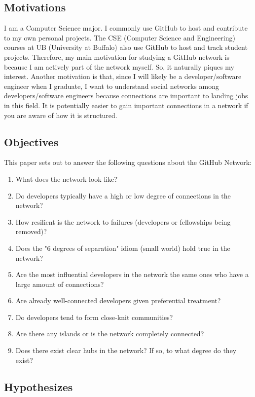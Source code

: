 \documentclass[9pt,twocolumn,twoside]{pnas-new}
\begin{document}
\subsection{Motivations} I am a Computer Science major. I commonly use GitHub to host and contribute to my own personal projects. The CSE (Computer Science and Engineering) courses at UB (University at Buffalo) also use GitHub to host and track student projects. Therefore, my main motivation for studying a GitHub network is because I am actively part of the network myself.  So, it naturally piques my interest. Another motivation is that, since I will likely be a developer/software engineer when I graduate, I want to understand social networks among developers/software engineers because connections are important to landing jobs in this field. It is potentially easier to gain important connections in a network if you are aware of how it is structured.

\subsection{Objectives} This paper sets out to answer the following questions about the GitHub Network:

\begin{enumerate}
  \item What does the network look like?
  \item Do developers typically have a high or low degree of connections in the network?
  \item How resilient is the network to failures (developers or fellowships being removed)?
  \item Does the "6 degrees of separation" idiom (small world) hold true in the network?
  \item Are the most influential developers in the network the same ones who have a large amount of connections?
  \item Are already well-connected developers given preferential treatment?
  \item Do developers tend to form close-knit communities?
  \item Are there any islands or is the network completely connected?
  \item Does there exist clear hubs in the network? If so, to what degree do they exist?
\end{enumerate}

\subsection{Hypothesizes} 
\end{document}
